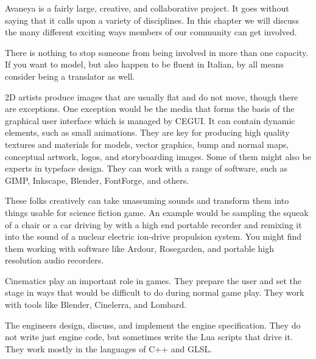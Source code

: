 
Avaneya is a fairly large, creative, and collaborative project. It goes without saying that it calls upon a variety of disciplines. In this chapter we will discuss the many different exciting ways members of our community can get involved.

There is nothing to stop someone from being involved in more than one capacity. If you want to model, but also happen to be fluent in Italian, by all means consider being a translator as well.


2D artists produce images that are usually flat and do not move, though there are exceptions. One exception would be the media that forms the basis of the graphical user interface which is managed by CEGUI. It can contain dynamic elements, such as small animations. They are key for producing high quality textures and materials for models, vector graphics, bump and normal maps, conceptual artwork, logos, and storyboarding images. Some of them might also be experts in typeface design. They can work with a range of software, such as GIMP, Inkscape, Blender, FontForge, and others.


These folks creatively can take unassuming sounds and transform them into things usable for science fiction game. An example would be sampling the squeak of a chair or a car driving by with a high end portable recorder and remixing it into the sound of a nuclear electric ion-drive propulsion system. You might find them working with software like Ardour, Rosegarden, and portable high resolution audio recorders.


Cinematics play an important role in games. They prepare the user and set the stage in ways that would be difficult to do during normal game play. They work with tools like Blender, Cinelerra, and Lombard.


The engineers design, discuss, and implement the engine specification. They do not write just engine code, but sometimes write the Lua scripts that drive it. They work mostly in the languages of C++ and GLSL. 

